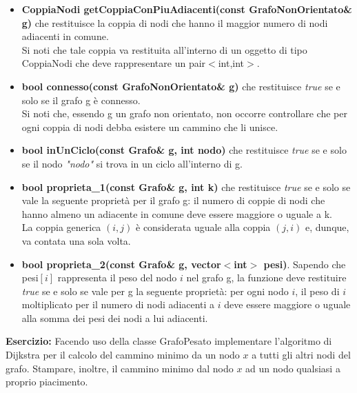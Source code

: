\documentclass{article}
\begin{document}
\begin{itemize}
    \item \textbf{CoppiaNodi getCoppiaConPiuAdiacenti(const GrafoNonOrientato\& g)} che restituisce la coppia di nodi che hanno il maggior numero di nodi adiacenti in comune.\\ Si noti che tale coppia va restituita all'interno di un oggetto di tipo CoppiaNodi che deve rappresentare un pair$<$int,int$>$.
    \item \textbf{bool connesso(const GrafoNonOrientato\& g)} che restituisce \textit{true} se e solo se il grafo g è connesso.\\ Si noti che, essendo g un grafo non orientato, non occorre controllare che per ogni coppia di nodi debba esistere un cammino che li unisce.
    \item \textbf{bool inUnCiclo(const Grafo\& g, int nodo)} che restituisce \textit{true} se e solo se il nodo \textit{"nodo"} si trova in un ciclo all'interno di g.\\
    \item \textbf{bool proprieta\_1(const Grafo\& g, int k)} che restituisce \textit{true} se e solo se vale la seguente proprietà per il grafo g: il numero di coppie di nodi che hanno almeno un adiacente in comune deve essere maggiore o uguale a k.\\ La coppia generica $(i,j)$ è considerata uguale alla coppia $(j,i)$ e, dunque, va contata una sola volta.
    \item \textbf{bool proprieta\_2(const Grafo\& g, vector$<$int$>$ pesi)}. Sapendo che pesi$[i]$ rappresenta il peso del nodo $i$ nel grafo g, la funzione deve restituire \textit{true} se e solo se vale per g la seguente proprietà: per ogni nodo $i$, il peso di $i$ moltiplicato per il numero di nodi adiacenti a $i$ deve essere maggiore o uguale alla somma dei pesi dei nodi a lui adiacenti.

\end{itemize}

\noindent \textbf{Esercizio:} Facendo uso della classe GrafoPesato implementare l'algoritmo di Dijkstra per il calcolo del cammino minimo da un nodo $x$ a tutti gli altri nodi del grafo. Stampare, inoltre, il cammino minimo dal nodo $x$ ad un nodo qualsiasi a proprio piacimento.
\end{document}
